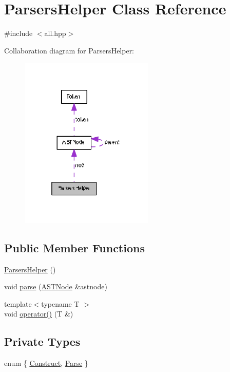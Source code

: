 \hypertarget{class_parsers_helper}{}\section{Parsers\+Helper Class Reference}
\label{class_parsers_helper}


{\ttfamily \#include $<$all.\+hpp$>$}



Collaboration diagram for Parsers\+Helper\+:
\nopagebreak
\begin{figure}[H]
\begin{center}
\leavevmode
\includegraphics[width=181pt]{class_parsers_helper__coll__graph}
\end{center}
\end{figure}
\subsection*{Public Member Functions}
\begin{DoxyCompactItemize}
\item 
\hyperlink{class_parsers_helper_a4abfe81f7251ffe4635c2ed2e482645d}{Parsers\+Helper} ()
\item 
void \hyperlink{class_parsers_helper_aa3c66d731d1e5e762aedc61d36e97cc6}{parse} (\hyperlink{struct_a_s_t_node}{A\+S\+T\+Node} \&astnode)
\item 
{\footnotesize template$<$typename T $>$ }\\void \hyperlink{class_parsers_helper_affae95c60593e3a8154f29e7b10daf17}{operator()} (T \&)
\end{DoxyCompactItemize}
\subsection*{Private Types}
\begin{DoxyCompactItemize}
\item 
enum \{ \hyperlink{class_parsers_helper_ac5239b5c4a61b2f239f668b738f613bea11c61fd76dd1cc499d0a82c995b29009}{Construct}, 
\hyperlink{class_parsers_helper_ac5239b5c4a61b2f239f668b738f613beae4bcb2b09e1ae01be6741b0d5dff5252}{Parse}
 \}
\end{DoxyCompactItemize}
